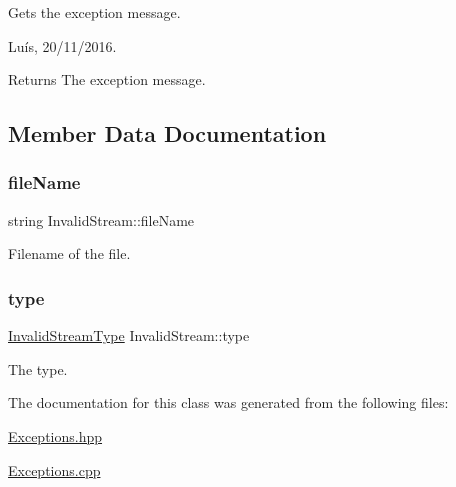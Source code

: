 Gets the exception message. 

Luís, 20/11/2016. 

\begin{DoxyReturn}{Returns}
The exception message. 
\end{DoxyReturn}


\subsection{Member Data Documentation}
\hypertarget{class_invalid_stream_abec03af0cdc07c0e52aa7a1daadd438c}{}\label{class_invalid_stream_abec03af0cdc07c0e52aa7a1daadd438c} 
\subsubsection{\texorpdfstring{file\+Name}{fileName}}
{\footnotesize\ttfamily string Invalid\+Stream\+::file\+Name\hspace{0.3cm}{\ttfamily [private]}}



Filename of the file. 

\hypertarget{class_invalid_stream_af18ab97f0a3db6cc76716b1bd7808832}{}\label{class_invalid_stream_af18ab97f0a3db6cc76716b1bd7808832} 
\subsubsection{\texorpdfstring{type}{type}}
{\footnotesize\ttfamily \hyperlink{_exceptions_8hpp_a20debbce0a9d256d07eac93067032a39}{Invalid\+Stream\+Type} Invalid\+Stream\+::type\hspace{0.3cm}{\ttfamily [private]}}



The type. 



The documentation for this class was generated from the following files\+:\begin{DoxyCompactItemize}
\item 
\hyperlink{_exceptions_8hpp}{Exceptions.\+hpp}\item 
\hyperlink{_exceptions_8cpp}{Exceptions.\+cpp}\end{DoxyCompactItemize}
